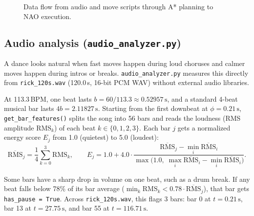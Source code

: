 \documentclass[11pt,a4paper]{article}
\newcommand{\code}[1]{\texttt{#1}}
\begin{document}
\begin{figure}[H]
  \caption{Data flow from audio and move scripts through A* planning to NAO execution.}
  \label{fig:arch}
\end{figure}

\subsection{Audio analysis (\texorpdfstring{\code{audio\_analyzer.py}}{audio\_analyzer.py})}

A dance looks natural when fast moves happen during loud choruses and calmer moves happen during intros or breaks. \code{audio\_analyzer.py} measures this directly from \code{rick\_120s.wav} (120.0\,s, 16-bit PCM WAV) without external audio libraries.

At 113.3\,BPM, one beat lasts $b = 60 / 113.3 \approx 0.52957\,\text{s}$, and a standard 4-beat musical bar lasts $4b = 2.11827\,\text{s}$. Starting from the first downbeat at $\phi = 0.21\,\text{s}$, \code{get\_bar\_features()} splits the song into 56 bars and reads the loudness (RMS amplitude $\text{RMS}_k$) of each beat $k \in \{0,1,2,3\}$. Each bar $j$ gets a normalized energy score $E_j$ from 1.0 (quietest) to 5.0 (loudest):
\[
  \overline{\text{RMS}}_j = \frac{1}{4}\sum_{k=0}^{3}\text{RMS}_k, \qquad
  E_j = 1.0 + 4.0 \cdot \frac{\overline{\text{RMS}}_j - \min_i \overline{\text{RMS}}_i}{\max\big(1.0,\; \max_i \overline{\text{RMS}}_i - \min_i \overline{\text{RMS}}_i\big)}.
\]

Some bars have a sharp drop in volume on one beat, such as a drum break. If any beat falls below 78\% of its bar average ($\min_k \text{RMS}_k < 0.78 \cdot \overline{\text{RMS}}_j$), that bar gets \code{has\_pause = True}. Across \code{rick\_120s.wav}, this flags 3 bars: bar 0 at $t = 0.21\,\text{s}$, bar 13 at $t = 27.75\,\text{s}$, and bar 55 at $t = 116.71\,\text{s}$.
\end{document}
